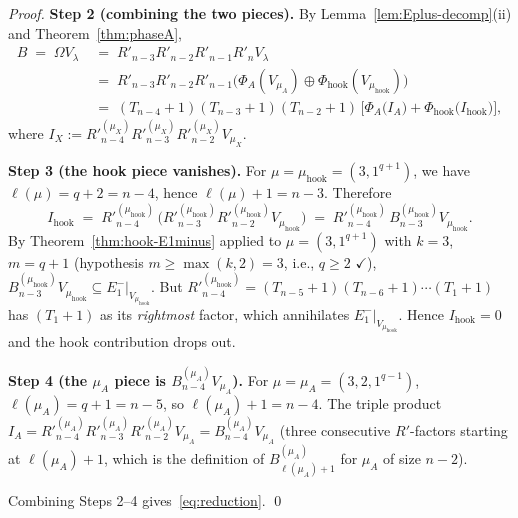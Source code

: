 \documentclass[11pt]{article}
\theoremstyle{definition}
\newcommand{\Om}{\Omega}
\newcommand{\Rp}{{R'}}
\begin{document}
\begin{proof}
\medskip\textbf{Step 2 (combining the two pieces).}
By Lemma~\ref{lem:Eplus-decomp}(ii) and Theorem~\ref{thm:phaseA},
\begin{align*}
   B \;=\; \Om V_\lambda
   &\;=\; R'_{n-3}R'_{n-2}R'_{n-1} R'_n V_\lambda \\
   &\;=\; R'_{n-3}R'_{n-2}R'_{n-1} \bigl(\Phi_A(V_{\mu_A}) \oplus \Phi_{\mathrm{hook}}(V_{\mu_{\mathrm{hook}}})\bigr) \\
   &\;=\; (T_{n-4}{+}1)(T_{n-3}{+}1)(T_{n-2}{+}1)\,
        \bigl[\Phi_A\bigl(I_A\bigr) + \Phi_{\mathrm{hook}}\bigl(I_{\mathrm{hook}}\bigr)\bigr],
\end{align*}
where $I_X := \Rp_{n-4}^{(\mu_X)} \Rp_{n-3}^{(\mu_X)} \Rp_{n-2}^{(\mu_X)} V_{\mu_X}$.

\medskip\textbf{Step 3 (the hook piece vanishes).}
For $\mu = \mu_{\mathrm{hook}} = (3, 1^{q+1})$, we have $\ell(\mu)
= q + 2 = n - 4$, hence $\ell(\mu) + 1 = n - 3$.  Therefore
\[
   I_{\mathrm{hook}} \;=\; \Rp_{n-4}^{(\mu_{\mathrm{hook}})}\,\bigl(\Rp_{n-3}^{(\mu_{\mathrm{hook}})} \Rp_{n-2}^{(\mu_{\mathrm{hook}})} V_{\mu_{\mathrm{hook}}}\bigr)
   \;=\; \Rp_{n-4}^{(\mu_{\mathrm{hook}})}\,B^{(\mu_{\mathrm{hook}})}_{n-3} V_{\mu_{\mathrm{hook}}}.
\]
By Theorem~\ref{thm:hook-E1minus} applied to $\mu = (3, 1^{q+1})$ with
$k = 3$, $m = q + 1$ (hypothesis $m \ge \max(k, 2) = 3$, i.e., $q \ge 2$
$\checkmark$), $B^{(\mu_{\mathrm{hook}})}_{n-3} V_{\mu_{\mathrm{hook}}}
\subseteq E_1^-|_{V_{\mu_{\mathrm{hook}}}}$.  But $\Rp_{n-4}^{(\mu_{\mathrm{hook}})}
= (T_{n-5}+1)(T_{n-6}+1)\cdots(T_1+1)$ has $(T_1+1)$ as its
\emph{rightmost} factor, which annihilates $E_1^-|_{V_{\mu_{\mathrm{hook}}}}$.
Hence $I_{\mathrm{hook}} = 0$ and the hook contribution drops out.

\medskip\textbf{Step 4 (the $\mu_A$ piece is $B^{(\mu_A)}_{n-4} V_{\mu_A}$).}
For $\mu = \mu_A = (3, 2, 1^{q-1})$, $\ell(\mu_A) = q + 1 = n - 5$,
so $\ell(\mu_A) + 1 = n - 4$.  The triple product $I_A =
\Rp_{n-4}^{(\mu_A)} \Rp_{n-3}^{(\mu_A)} \Rp_{n-2}^{(\mu_A)} V_{\mu_A}
= B^{(\mu_A)}_{n-4} V_{\mu_A}$ (three consecutive $R'$-factors starting
at $\ell(\mu_A) + 1$, which is the definition of $B^{(\mu_A)}_{\ell(\mu_A)+1}$
for $\mu_A$ of size $n - 2$).

Combining Steps 2--4 gives~\eqref{eq:reduction}.
\qed
\end{proof}
\end{document}

